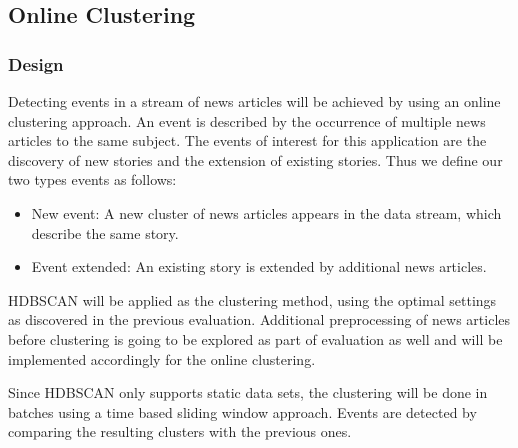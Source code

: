 \subsection{Online Clustering}

\subsubsection{Design}

Detecting events in a stream of news articles will be achieved by using an online clustering approach. An event is described by the occurrence of multiple news articles to the same subject. The events of interest for this application are the discovery of new stories and the extension of existing stories. Thus we define our two types events as follows:

\begin{itemize}
    \item New event: A new cluster of news articles appears in the data stream, which describe the same story.
    \item Event extended: An existing story is extended by additional news articles.
\end{itemize}

HDBSCAN will be applied as the clustering method, using the optimal settings as discovered in the previous evaluation. Additional preprocessing of news articles before clustering is going to be explored as part of evaluation as well and will be implemented accordingly for the online clustering.

Since HDBSCAN only supports static data sets, the clustering will be done in batches using a time based sliding window approach. Events are detected by comparing the resulting clusters with the previous ones.

